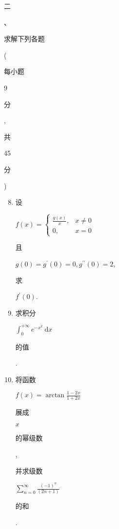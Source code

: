 \documentclass[10pt]{article}
\begin{document}
\begin{CJK}{UTF8}{mj}二\end{CJK}、\begin{CJK}{UTF8}{mj}求解下列各题\end{CJK} (\begin{CJK}{UTF8}{mj}每小题\end{CJK} 9 \begin{CJK}{UTF8}{mj}分\end{CJK}, \begin{CJK}{UTF8}{mj}共\end{CJK} 45 \begin{CJK}{UTF8}{mj}分\end{CJK})

\begin{enumerate}
  \setcounter{enumi}{7}
  \item \begin{CJK}{UTF8}{mj}设\end{CJK} $f(x)=\left\{\begin{array}{ll}\frac{g(x)}{x}, & x \neq 0 \\ 0, & x=0\end{array}\right.$ \begin{CJK}{UTF8}{mj}且\end{CJK} $g(0)=g^{\prime}(0)=0, g^{\prime \prime}(0)=2$, \begin{CJK}{UTF8}{mj}求\end{CJK} $f^{\prime}(0)$.

  \item \begin{CJK}{UTF8}{mj}求积分\end{CJK} $\int_{0}^{+\infty} e^{-x^{2}} \mathrm{~d} x$ \begin{CJK}{UTF8}{mj}的值\end{CJK}.

  \item \begin{CJK}{UTF8}{mj}将函数\end{CJK} $f(x)=\arctan \frac{1-2 x}{1+2 x}$ \begin{CJK}{UTF8}{mj}展成\end{CJK} $x$ \begin{CJK}{UTF8}{mj}的幂级数\end{CJK}, \begin{CJK}{UTF8}{mj}并求级数\end{CJK} $\sum_{n=0}^{\infty} \frac{(-1)^{n}}{(2 n+1)}$ \begin{CJK}{UTF8}{mj}的和\end{CJK}.


\end{enumerate}
\end{document}
